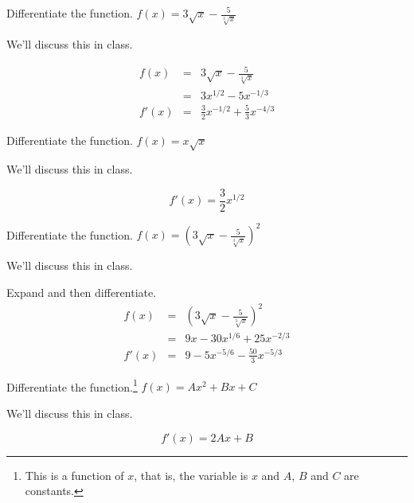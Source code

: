 \documentclass[12pt,addpoints, answers, fleqn]{exam}
\begin{document}
\begin{questions}
\begin{solution}
\end{solution}


\question Differentiate the function.
$ \displaystyle f \left( x \right) = 3\sqrt{x} - \frac{5}{\sqrt[3]{x}}$

\begin{solution}
We'll discuss this in class.

\begin{eqnarray*}
f \left( x \right) &=&  3\sqrt{x} - \frac{5}{\sqrt[3]{x}}\\
 &=& 3x^{1/2} - 5x^{-1/3}\\
f' \left( x \right) &=& \frac{3}{2}x^{-1/2} + \frac{5}{3}x^{-4/3}
\end{eqnarray*}
\end{solution}

\question Differentiate the function.
$ \displaystyle f \left( x \right) = x \sqrt{x}$

\begin{solution}
We'll discuss this in class.

\[
f '\left( x \right) = \frac{3}{2} x^{1/2}
\]
\end{solution}


\question Differentiate the function.
$ \displaystyle f \left( x \right) = \left( 3\sqrt{x} - \frac{5}{\sqrt[3]{x}} \right)^2$

\begin{solution}
We'll discuss this in class.

Expand and then differentiate.
\begin{eqnarray*}
f \left( x \right) &=& \left( 3\sqrt{x} - \frac{5}{\sqrt[3]{x}} \right)^2\\
 &=& 9x -30x^{1/6} + 25x^{-2/3}\\
f' \left( x \right) &=& 9 - 5 x^{-5/6} - \frac{50}{3}x^{-5/3}
\end{eqnarray*}

\end{solution}




\question Differentiate the function.\footnote{This is a function of $x$, that is, the variable is $x$ and $A$, $B$ and $C$ are constants.}
$ \displaystyle f \left( x \right) = Ax^2 + Bx + C$

\begin{solution}
We'll discuss this in class.

\[
f'\left( x \right) = 2Ax+B
\]
\end{solution}






\end{questions}
\end{document}
